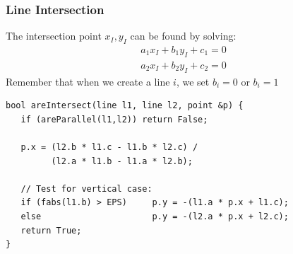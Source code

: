 \begin{frame}[fragile]
  \frametitle{Line Intersection}
    The intersection point $x_I, y_I$ can be found by solving:
    \begin{eqnarray*}
      a_1x_I+b_1y_I+c_1 = 0\\a_2x_I+b_2y_I+c_2 = 0
    \end{eqnarray*}
    Remember that when we create a line $i$, we set $b_i=0$ or $b_i=1$

    {\smaller
    \begin{exampleblock}{}
\begin{verbatim}
bool areIntersect(line l1, line l2, point &p) {
   if (areParallel(l1,l2)) return False;

   p.x = (l2.b * l1.c - l1.b * l2.c) /
         (l2.a * l1.b - l1.a * l2.b);

   // Test for vertical case:
   if (fabs(l1.b) > EPS)     p.y = -(l1.a * p.x + l1.c);
   else                      p.y = -(l2.a * p.x + l2.c);
   return True;
}
\end{verbatim}
    \end{exampleblock}

  }
\end{frame}

